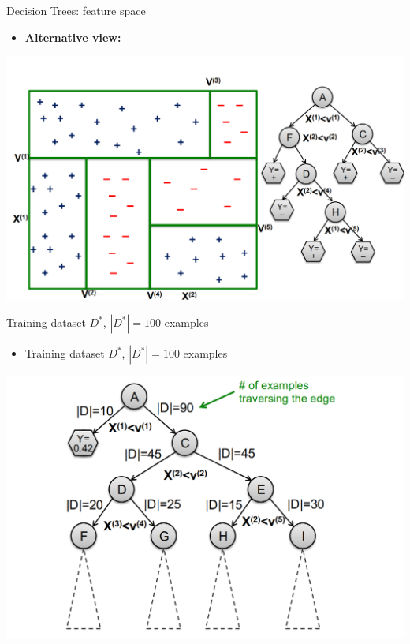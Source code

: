 \begin{frame}{Decision Trees: feature space}
    \begin{itemize}
        \item \textbf{Alternative view:}
        \end{itemize}
        \includegraphics[width=\linewidth]{images/decision-trees/decision-trees-6.png}
\end{frame}


\begin{frame}{Training dataset $D^*$, $|D^*| = 100$ examples}
    \begin{itemize}
        \item Training dataset $D^*$, $|D^*| = 100$ examples
    \end{itemize}

    \begin{center}
        \includegraphics[width=0.8\linewidth]{images/decision-trees/decision-trees-7.png}
    \end{center}
\end{frame}


